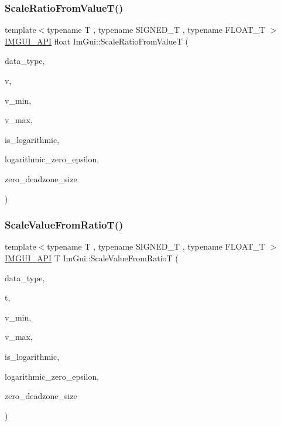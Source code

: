 \mbox{\label{namespaceImGui_a9419b0ce18eb927db258d308d8c02a7e}} 
\subsubsection{\texorpdfstring{Scale\+Ratio\+From\+Value\+T()}{ScaleRatioFromValueT()}}
{\footnotesize\ttfamily template$<$typename T , typename S\+I\+G\+N\+E\+D\+\_\+T , typename F\+L\+O\+A\+T\+\_\+T $>$ \\
\hyperlink{imgui_8h_a43829975e84e45d1149597467a14bbf5}{I\+M\+G\+U\+I\+\_\+\+A\+PI} float Im\+Gui\+::\+Scale\+Ratio\+From\+ValueT (\begin{DoxyParamCaption}\item[{Im\+Gui\+Data\+Type}]{data\+\_\+type,  }\item[{T}]{v,  }\item[{T}]{v\+\_\+min,  }\item[{T}]{v\+\_\+max,  }\item[{bool}]{is\+\_\+logarithmic,  }\item[{float}]{logarithmic\+\_\+zero\+\_\+epsilon,  }\item[{float}]{zero\+\_\+deadzone\+\_\+size }\end{DoxyParamCaption})}

\mbox{\label{namespaceImGui_a1c3679262e23e28b9e71f1d237826156}} 
\subsubsection{\texorpdfstring{Scale\+Value\+From\+Ratio\+T()}{ScaleValueFromRatioT()}}
{\footnotesize\ttfamily template$<$typename T , typename S\+I\+G\+N\+E\+D\+\_\+T , typename F\+L\+O\+A\+T\+\_\+T $>$ \\
\hyperlink{imgui_8h_a43829975e84e45d1149597467a14bbf5}{I\+M\+G\+U\+I\+\_\+\+A\+PI} T Im\+Gui\+::\+Scale\+Value\+From\+RatioT (\begin{DoxyParamCaption}\item[{Im\+Gui\+Data\+Type}]{data\+\_\+type,  }\item[{float}]{t,  }\item[{T}]{v\+\_\+min,  }\item[{T}]{v\+\_\+max,  }\item[{bool}]{is\+\_\+logarithmic,  }\item[{float}]{logarithmic\+\_\+zero\+\_\+epsilon,  }\item[{float}]{zero\+\_\+deadzone\+\_\+size }\end{DoxyParamCaption})}

